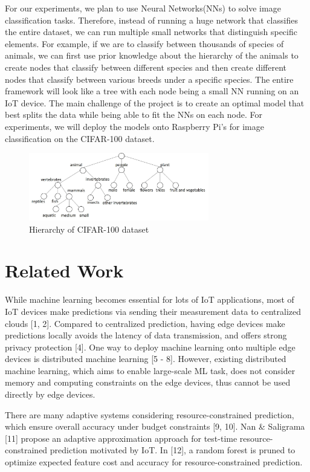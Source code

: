 \documentclass{article}
\begin{document}
For our experiments, we plan to use Neural Networks(NNs) to solve image classification tasks. Therefore, instead of running a huge network that classifies the entire dataset, we can run multiple small networks that distinguish specific elements. For example, if we are to classify between thousands of species of animals, we can first use prior knowledge about the hierarchy of the animals to create nodes that classify between different species and then create different nodes that classify between various breeds under a specific species. The entire framework will look like a tree with each node being a small NN running on an IoT device. The main challenge of the project is to create an optimal model that best splits the data while being able to fit the NNs on each node. For experiments, we will deploy the models onto Raspberry Pi’s for image classification on the CIFAR-100 dataset.

\begin{figure}[ht]
  \centering
  \includegraphics[width=0.7\textwidth]{fig1.jpg}
  \caption{Hierarchy of CIFAR-100 dataset}
\end{figure}

\section{Related Work}
While machine learning becomes essential for lots of IoT applications, most of IoT devices make predictions via sending their measurement data to centralized clouds [1, 2]. Compared to centralized prediction, having edge devices make predictions locally avoids the latency of data transmission, and offers strong privacy protection [4]. One way to deploy machine learning onto multiple edge devices is distributed machine learning [5 - 8]. However, existing distributed machine learning, which aims to enable large-scale ML task, does not consider memory and computing constraints on the edge devices, thus cannot be used directly by edge devices. 

There are many adaptive systems considering resource-constrained prediction, which ensure overall accuracy under budget constraints [9, 10]. Nan \& Saligrama [11] propose an adaptive approximation approach for test-time resource-constrained prediction motivated by IoT. In [12], a random forest is pruned to optimize expected feature cost and accuracy for resource-constrained prediction. 
\end{document}
